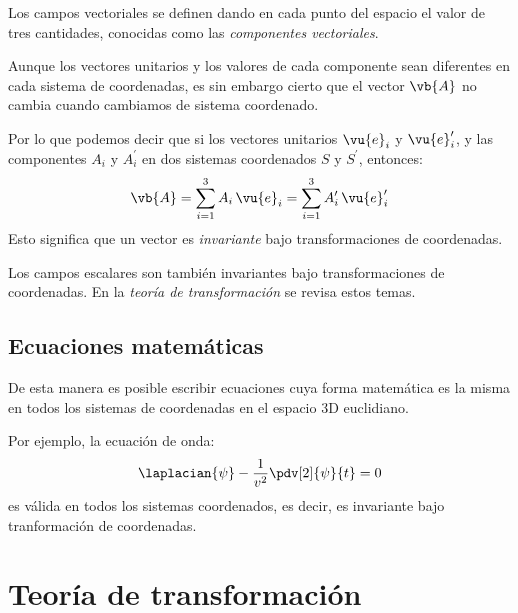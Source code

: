 Los campos vectoriales se definen dando en cada punto del espacio el valor de tres cantidades, conocidas como las \emph{componentes vectoriales}.
\par
Aunque los vectores unitarios y los valores de cada componente sean diferentes en cada sistema de coordenadas, es sin embargo cierto que el vector $\vb{A}$ no cambia cuando cambiamos de sistema coordenado.
\par
Por lo que podemos decir que si los vectores unitarios $\vu{e}_{i}$ y $\vu{e}_{i}^{\prime}$, y las componentes $A_{i}$ y $A_{i}^{\prime}$ en dos sistemas coordenados $S$ y $S^{\prime}$, entonces:
\begin{align*}
\vb{A} = \sum_{i=1}^{3} A_{i} \, \vu{e}_{i} = \sum_{i=1}^{3} A_{i}^{\prime} \, \vu{e}_{i}^{\prime}
\end{align*}
Esto significa que un vector es \emph{invariante} bajo transformaciones de coordenadas.
\par
Los campos escalares son también invariantes bajo transformaciones de coordenadas. En la \emph{teoría de transformación} se revisa estos temas.

\subsection*{Ecuaciones matemáticas}

De esta manera es posible escribir ecuaciones cuya forma matemática es la misma en todos los sistemas de coordenadas en el espacio 3D euclidiano.
\par
Por ejemplo, la ecuación de onda:
\begin{align*}
\laplacian{\psi} - \dfrac{1}{v^{2}} \pdv[2]{\psi}{t} = 0
\end{align*}
es válida en todos los sistemas coordenados, es decir, es invariante bajo tranformación de coordenadas.

\section{Teoría de transformación}

